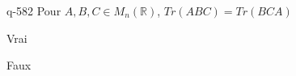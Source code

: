 \begin{truefalse}{q-582}
Pour $A, B, C \in M_n(\mathbb R)$, $Tr(ABC)=Tr(BCA)$
\item* Vrai
\item Faux
\end{truefalse}

